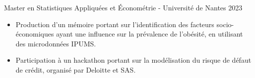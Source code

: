 Master en Statistiques Appliquées et Économétrie - Université de Nantes
2023
\begin{itemize}
	\item Production d’un mémoire portant sur l’identification des facteurs socio-économiques ayant une influence sur la prévalence de l’obésité, en utilisant des microdonnées IPUMS.
	\item Participation à un hackathon portant sur la modélisation du risque de défaut de crédit, organisé par Deloitte et SAS.
\end{itemize}